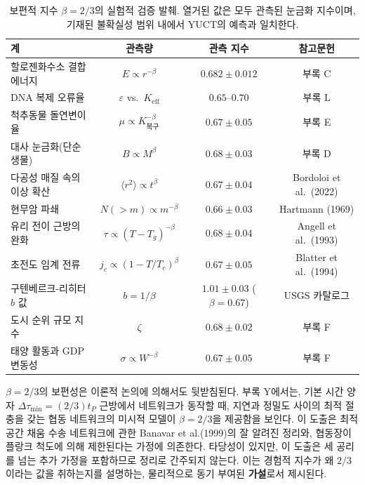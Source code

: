 \documentclass[12pt,a4paper]{article}
\begin{document}
	\begin{table}[H]
		\centering
		\caption{보편적 지수 \(\beta = 2/3\)의 실험적 검증 발췌. 열거된 값은 모두 관측된 눈금화 지수이며, 기재된 불확실성 범위 내에서 YUCT의 예측과 일치한다.}
		\label{tab:beta-evidence}
		\small
		\begin{tabular}{l c c c}
			\toprule
			\textbf{계} & \textbf{관측량} & \textbf{관측 지수} & \textbf{참고문헌} \\
			\midrule
			할로젠화수소 결합 에너지 & \(E \propto r^{-\beta}\) & \(0.682 \pm 0.012\) & 부록 C \\
			DNA 복제 오류율 & \(\varepsilon\) vs.\ \(K_{\mathrm{eff}}\) & \(0.65\text{--}0.70\) & 부록 L \\
			척추동물 돌연변이율 & \(\mu \propto K_{\text{복구}}^{-\beta}\) & \(0.67 \pm 0.05\) & 부록 E \\
			대사 눈금화(단순 생물) & \(B \propto M^{\beta}\) & \(0.68 \pm 0.03\) & 부록 D \\
			다공성 매질 속의 이상 확산 & \(\langle r^2 \rangle \propto t^{\beta}\) & \(0.67 \pm 0.04\) & Bordoloi et al.\ (2022) \\
			현무암 파쇄 & \(N(>m) \propto m^{-\beta}\) & \(0.66 \pm 0.03\) & Hartmann (1969) \\
			유리 전이 근방의 완화 & \(\tau \propto (T-T_g)^{-\beta}\) & \(0.68 \pm 0.04\) & Angell et al.\ (1993) \\
			초전도 임계 전류 & \(j_c \propto (1-T/T_c)^{\beta}\) & \(0.67 \pm 0.05\) & Blatter et al.\ (1994) \\
			구텐베르크-리히터 \(b\) 값 & \(b = 1/\beta\) & \(1.01 \pm 0.03\) (\(\beta=0.67\)) & USGS 카탈로그 \\
			도시 순위 규모 지수 & \(\zeta\) & \(0.68 \pm 0.02\) & 부록 F \\
			태양 활동과 GDP 변동성 & \(\sigma \propto W^{-\beta}\) & \(0.67 \pm 0.05\) & 부록 F \\
			\bottomrule
		\end{tabular}
	\end{table}
	
	\(\beta = 2/3\)의 보편성은 이론적 논의에 의해서도 뒷받침된다. 부록 Y에서는, 기본 시간 양자 \(\Delta\tau_{\min} = (2/3) t_P\) 근방에서 네트워크가 동작할 때, 지연과 정밀도 사이의 최적 절충을 갖는 협동 네트워크의 미시적 모델이 \(\beta = 2/3\)을 제공함을 보인다. 이 도출은 최적 공간 채움 수송 네트워크에 관한 Banavar et al.(1999)의 잘 알려진 정리와, 협동장이 플랑크 척도에 의해 제한된다는 가정에 의존한다. 타당성이 있지만, 이 도출은 세 공리를 넘는 추가 가정을 포함하므로 정리로 간주되지 않는다. 이는 경험적 지수가 왜 \(2/3\)이라는 값을 취하는지를 설명하는, 물리적으로 동기 부여된 \textbf{가설}로서 제시된다.
	
\end{document}
